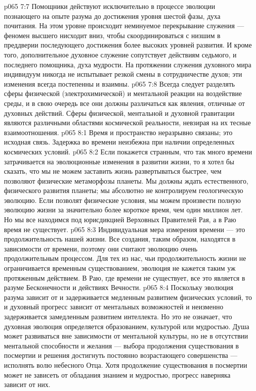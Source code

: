 \vs p065 7:7 Помощники действуют исключительно в процессе эволюции познающего на опыте разума до достижения уровня шестой фазы, духа почитания. На этом уровне происходит неминуемое перекрывание служения --- феномен высшего нисходит вниз, чтобы скоординироваться с низшим в преддверии последующего достижения более высоких уровней развития. И кроме того, дополнительное духовное служение сопутствует действиям седьмого, и последнего помощника, духа мудрости. На протяжении служения духовного мира индивидуум никогда не испытывает резкой смены в сотрудничестве духов; эти изменения всегда постепенны и взаимны.
\vs p065 7:8 Всегда следует разделять сферы физической (электрохимической) и ментальной реакции на воздействие среды, и в свою очередь все они должны различаться как явления, отличные от духовных действий. Сферы физической, ментальной и духовной гравитации являются различными областями космической реальности, невзирая на их тесные взаимоотношения.
\vs p065 8:1 Время и пространство неразрывно связаны; это исходная связь. Задержка во времени неизбежна при наличии определенных космических условий.
\vs p065 8:2 Если покажется странным, что так много времени затрачивается на эволюционные изменения в развитии жизни, то я хотел бы сказать, что мы не можем заставить жизнь развертываться быстрее, чем позволяют физические метаморфозы планеты. Мы должны ждать естественного, физического развития планеты; мы абсолютно не контролируем геологическую эволюцию. Если позволят физические условия, мы можем произвести полную эволюцию жизни за значительно более короткое время, чем один миллион лет. Но мы все находимся под юрисдикцией Верховных Правителей Рая, а в Раю время не существует.
\vs p065 8:3 Индивидуальная мера измерения времени --- это продолжительность нашей жизни. Все создания, таким образом, находятся в зависимости от времени, поэтому они считают эволюцию очень продолжительным процессом. Для тех из нас, чьи продолжительность жизни не ограничивается временным существованием, эволюция не кажется таким уж протяженным действием. В Раю, где времени не существует, все это является  в разуме Бесконечности и действиях Вечности.
\vs p065 8:4 Поскольку эволюция разума зависит от и задерживается медленным развитием физических условий, то и духовный прогресс зависит от ментальных возможностей и неизменно задерживается замедленным развитием интеллекта. Но это не означает, что духовная эволюция определяется образованием, культурой или мудростью. Душа может развиваться вне зависимости от ментальной культуры, но не в отсутствии ментальной способности и желания --- выбора продолжения существования в посмертии и решения достигнуть постоянно возрастающего совершенства --- исполнять волю небесного Отца. Хотя продолжение существования в посмертии может не зависеть от обладания знанием и мудростью, прогресс наверняка зависит от них.
